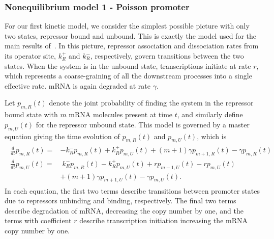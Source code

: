 \documentclass[12pt]{article}%
\newcommand{\deriv}[2][{}]{\frac{d #1}{d #2}}
\begin{document}
\subsubsection{Nonequilibrium model 1 - Poisson promoter}
For our first kinetic model, we consider the simplest possible
picture with only two states, repressor bound and unbound.
This is exactly the model used for the main results of~\cite{Jones2014}.
In this picture, repressor association and dissociation rates
from its operator site, $k_R^+$ and $k_R^-$, respectively, govern
transitions between the two states. When the system is in the
unbound state, transcriptions initiate at rate $r$, which
represents a coarse-graining of all the downstream processes into
a single effective rate. mRNA is again degraded at rate $\gamma$.

Let $p_{m,R}(t)$ denote the joint probability of finding the
system in the repressor bound state with $m$ mRNA molecules
present at time $t$, and similarly define $p_{m,U}(t)$ for the
repressor unbound state. 
This model is governed by a master equation giving the time
evolution of $p_{m,R}(t)$ and $p_{m,U}(t)$, which is
\begin{align}
\begin{split}
\deriv{t}p_{m,R}(t) =& - k_R^- p_{m,R}(t) + k_R^+ p_{m,U}(t)
                + (m+1)\gamma p_{m+1,R}(t) - \gamma p_{m,R}(t)
\\
\deriv{t}p_{m,U}(t) =&\; k_R^- p_{m,R}(t) - k_R^+ p_{m,U}(t)
                        + rp_{m-1,U}(t) - rp_{m,U}(t)
                \\
                &+ (m+1)\gamma p_{m+1,U}(t) - \gamma p_{m,U}(t).
\end{split}
\end{align}
In each equation, the first two terms describe transitions
between promoter states due to repressors unbinding and binding,
respectively. The final two terms describe degradation of mRNA,
decreasing the copy number by one, and the terms with coefficient
$r$ describe transcription initiation increasing the mRNA copy
number by one.
\end{document}
